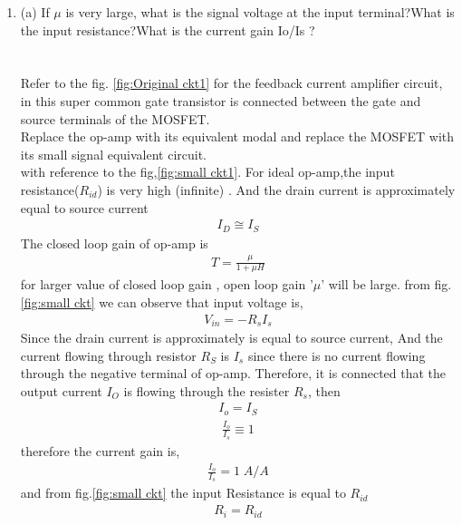\begin{enumerate}[label=\thesection.\arabic*.,ref=\thesection.\theenumi]
\item 
\label{Question_1a_ee18btech11023}
(a) If $\mu$ is very large, what is the signal voltage at the input
terminal?What is the input resistance?What is the current
gain Io/Is ?\\
\\
\solution \\
Refer to the fig. \ref{fig:Original ckt1} for the feedback current amplifier circuit, in this super common gate transistor is connected between the gate and source terminals of the MOSFET.\\
Replace the op-amp with its equivalent modal and replace the MOSFET with its small signal equivalent circuit.\\
with reference to the fig,\ref{fig:small ckt1}. For ideal op-amp,the input resistance($R_{id}$) is very high (infinite) . And the drain current is approximately equal to source current
\begin{align}
    I_{D} \cong  I_{S}
\label{eq_ee18btech11023_1}
\end{align}
The closed loop gain of op-amp is
\begin{align}
    T = \frac{\mu}{1 + \mu H}
    \label{eq_ee18btech11023_2}
\end{align}
for larger value of closed loop gain , open loop gain '$\mu$' will be large. 
from fig.\ref{fig:small ckt} we can observe that input voltage is,
\begin{align}
    V_{in} = -R_sI_s
    \label{eq_ee18btech11023_3}
\end{align}
Since the drain current is approximately is equal to source current, And the current flowing through resistor $R_S$ is $I_s$ since there is no current flowing through the negative terminal of  op-amp. Therefore, it is connected that the output current $I_O$ is flowing through the resister $R_s$, then
\begin{align}
    I_o = I_S
    \label{eq_ee18btech11023_4}
\end{align}
\begin{align*}
    \frac{I_o}{I_s} \equiv 1 
\end{align*}
therefore the current gain is,
\begin{align}
    \frac{I_o}{I_s} = 1 \; A/A
    \label{eq_ee18btech11023_5}
\end{align}
and from fig.\ref{fig:small ckt} the input Resistance is equal to $R_{id}$
\begin{align}
    R_{i} = R_{id}
    \label{eq_ee18btech11023_6}
\end{align}


\end{enumerate}
